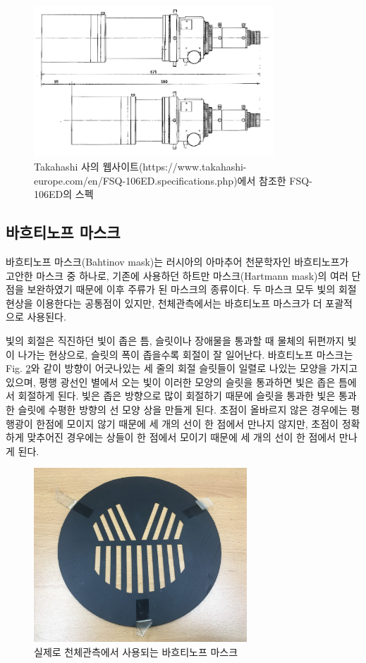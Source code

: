 \documentclass[twoside,11pt]{gshs_thesis}
\begin{document}
  \begin{figure}[h]
 	\begin{center}
 		\includegraphics[width = 9cm]{FSQ_106ED_tube}
 	\end{center}
 	\caption{Takahashi 사의 웹사이트(https://www.takahashi-europe.com/en/FSQ-106ED.specifications.php)에서 참조한 FSQ-106ED의 스펙}
 	\label{FSQ}
 \end{figure}
 
\subsection{바흐티노프 마스크}

 바흐티노프 마스크(Bahtinov mask)는 러시아의 아마추어 천문학자인 바흐티노프가 고안한 마스크 중 하나로, 기존에 사용하던 하트만 마스크(Hartmann mask)의 여러 단점을 보완하였기 때문에 이후 주류가 된 마스크의 종류이다. 두 마스크 모두 빛의 회절 현상을 이용한다는 공통점이 있지만, 천체관측에서는 바흐티노프 마스크가 더 포괄적으로 사용된다. 
 
 빛의 회절은 직진하던 빛이 좁은 틈, 슬릿이나 장애물을 통과할 때 물체의 뒤편까지 빛이 나가는 현상으로, 슬릿의 폭이 좁을수록 회절이 잘 일어난다. 바흐티노프 마스크는 Fig. \ref{bahtinov}와 같이 방향이 어긋나있는 세 줄의 회절 슬릿들이 일렬로 나있는 모양을 가지고 있으며, 평행 광선인 별에서 오는 빛이 이러한 모양의 슬릿을 통과하면 빛은 좁은 틈에서 회절하게 된다. 빛은 좁은 방향으로 많이 회절하기 때문에 슬릿을 통과한 빛은 통과한 슬릿에 수평한 방향의 선 모양 상을 만들게 된다. 초점이 올바르지 않은 경우에는 평행광이 한점에 모이지 않기 때문에 세 개의 선이 한 점에서 만나지 않지만, 초점이 정확하게 맞추어진 경우에는 상들이 한 점에서 모이기 때문에 세 개의 선이 한 점에서 만나게 된다.
 
 \begin{figure}[h]
 	\begin{center}
 		\includegraphics[width = 8cm]{bahtinov1}
 	\end{center}
 	\caption{실제로 천체관측에서 사용되는 바흐티노프 마스크}
 	\label{bahtinov}
 \end{figure}
 
\end{document}
